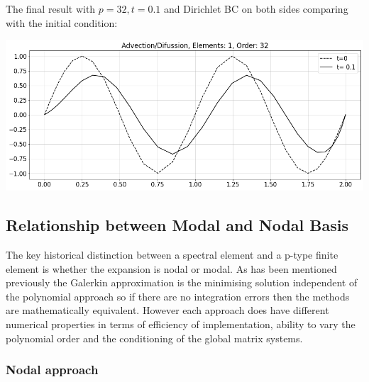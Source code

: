 \documentclass[
  a4paper,
  10pt]{article}
\begin{document}
The final result with \(p=32, t=0.1\) and Dirichlet BC on both sides
comparing with the initial condition:

\includegraphics{figs/3d969364028d7ae5e24eb792b401314b71724e68.png}

\hypertarget{relationship-between-modal-and-nodal-basis}{%
\subsection{Relationship between Modal and Nodal
Basis}\label{relationship-between-modal-and-nodal-basis}}

The key historical distinction between a spectral element and a p-type
finite element is whether the expansion is nodal or modal. As has been
mentioned previously the Galerkin approximation is the minimising
solution independent of the polynomial approach so if there are no
integration errors then the methods are mathematically equivalent.
However each approach does have different numerical properties in terms
of efficiency of implementation, ability to vary the polynomial order
and the conditioning of the global matrix systems.

\hypertarget{nodal-approach}{%
\subsubsection{Nodal approach}\label{nodal-approach}}
\end{document}
